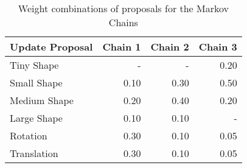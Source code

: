 \begin{table}
  \centering
  \caption{Weight combinations of proposals for the Markov Chains}
  \label{tbl:markovchains}
  \begin{tabular}{lrrr}
    \toprule
      \textbf{Update Proposal} &
      Chain 1 &
      Chain 2 &
      Chain 3 \\
    \midrule
      Tiny Shape & - & - & 0.20 \\
      Small Shape & 0.10 & 0.30 & 0.50 \\
      Medium Shape & 0.20 & 0.40 & 0.20 \\
      Large Shape & 0.10 & 0.10 & - \\
      Rotation & 0.30 & 0.10 & 0.05 \\
      Translation & 0.30 & 0.10 & 0.05 \\
    \bottomrule
  \end{tabular}
\end{table}
